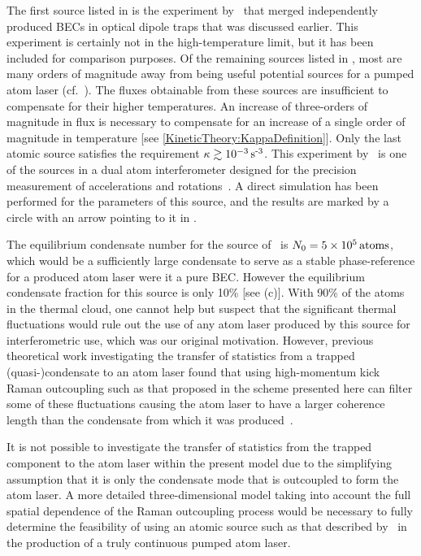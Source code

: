 The first source listed in  is the experiment by~\citet{Chikkatur:2002qa} that merged independently produced BECs in optical dipole traps that was discussed earlier.  This experiment is certainly not in the high-temperature limit, but it has been included for comparison purposes.  Of the remaining sources listed in , most are many orders of magnitude away from being useful potential sources for a pumped atom laser (cf.~).  The fluxes obtainable from these sources are insufficient to compensate for their higher temperatures. An increase of three-orders of magnitude in flux is necessary to compensate for an increase of a single order of magnitude in temperature [see \eqref{KineticTheory:KappaDefinition}].  Only the last atomic source satisfies the requirement $\kappa \gtrsim \unit[10^{-3}]{s\textsuperscript{-3}}$.  This experiment by~\citet{Muller:2007} is one of the sources in a dual atom interferometer designed for the precision measurement of accelerations and rotations~\citep{Muller:2009}.  A direct simulation has been performed for the parameters of this source, and the results are marked by a circle with an arrow pointing to it in .  

The equilibrium condensate number for the source of~\citet{Muller:2007} is $N_0 = \unit[5 \times 10^5]{atoms}$, which would be a sufficiently large condensate to serve as a stable phase-reference for a produced atom laser were it a pure BEC.  However the equilibrium condensate fraction for this source is only 10\% [see (c)].  With 90\% of the atoms in the thermal cloud, one cannot help but suspect that the significant thermal fluctuations would rule out the use of any atom laser produced by this source for interferometric use, which was our original motivation.  However, previous theoretical work investigating the transfer of statistics from a trapped (quasi-)condensate to an atom laser found that using high-momentum kick Raman outcoupling such as that proposed in the scheme presented here can filter some of these fluctuations causing the atom laser to have a larger coherence length than the condensate from which it was produced~\citep{Proukakis:2003}.  

It is not possible to investigate the transfer of statistics from the trapped component to the atom laser within the present model due to the simplifying assumption that it is only the condensate mode that is outcoupled to form the atom laser.  A more detailed three-dimensional model taking into account the full spatial dependence of the Raman outcoupling process would be necessary to fully determine the feasibility of using an atomic source such as that described by~\citet{Muller:2007} in the production of a truly continuous pumped atom laser.

